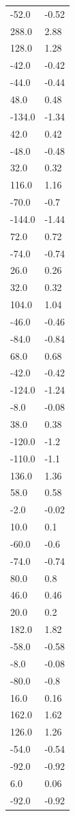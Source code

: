 \begin{longtable}{ll}
-52.0 & -0.52 \\
288.0 & 2.88 \\
128.0 & 1.28 \\
-42.0 & -0.42 \\
-44.0 & -0.44 \\
48.0 & 0.48 \\
-134.0 & -1.34 \\
42.0 & 0.42 \\
-48.0 & -0.48 \\
32.0 & 0.32 \\
116.0 & 1.16 \\
-70.0 & -0.7 \\
-144.0 & -1.44 \\
72.0 & 0.72 \\
-74.0 & -0.74 \\
26.0 & 0.26 \\
32.0 & 0.32 \\
104.0 & 1.04 \\
-46.0 & -0.46 \\
-84.0 & -0.84 \\
68.0 & 0.68 \\
-42.0 & -0.42 \\
-124.0 & -1.24 \\
-8.0 & -0.08 \\
38.0 & 0.38 \\
-120.0 & -1.2 \\
-110.0 & -1.1 \\
136.0 & 1.36 \\
58.0 & 0.58 \\
-2.0 & -0.02 \\
10.0 & 0.1 \\
-60.0 & -0.6 \\
-74.0 & -0.74 \\
80.0 & 0.8 \\
46.0 & 0.46 \\
20.0 & 0.2 \\
182.0 & 1.82 \\
-58.0 & -0.58 \\
-8.0 & -0.08 \\
-80.0 & -0.8 \\
16.0 & 0.16 \\
162.0 & 1.62 \\
126.0 & 1.26 \\
-54.0 & -0.54 \\
-92.0 & -0.92 \\
6.0 & 0.06 \\
-92.0 & -0.92 \\

\end{longtable}
